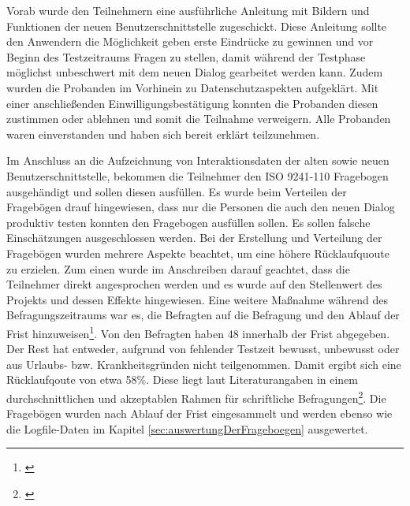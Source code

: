 Vorab wurde den Teilnehmern eine ausführliche Anleitung mit Bildern und Funktionen der neuen Benutzerschnittstelle zugeschickt. Diese Anleitung sollte den Anwendern die Möglichkeit geben erste Eindrücke zu gewinnen und vor Beginn des Testzeitraums Fragen zu stellen, damit während der Testphase möglichst unbeschwert mit dem neuen Dialog gearbeitet werden kann. Zudem wurden die Probanden im Vorhinein zu Datenschutzaspekten aufgeklärt. Mit einer anschließenden Einwilligungsbestätigung konnten die Probanden diesen zustimmen oder ablehnen und somit die Teilnahme verweigern. Alle Probanden waren einverstanden und haben sich bereit erklärt teilzunehmen.

Im Anschluss an die Aufzeichnung von Interaktionsdaten der alten sowie neuen Benutzerschnittstelle, bekommen die Teilnehmer den ISO 9241-110 Fragebogen ausgehändigt und sollen diesen ausfüllen. Es wurde beim Verteilen der Fragebögen drauf hingewiesen, dass nur die Personen die auch den neuen Dialog produktiv testen konnten den Fragebogen ausfüllen sollen. Es sollen falsche Einschätzungen ausgeschlossen werden. Bei der Erstellung und Verteilung der Fragebögen wurden mehrere Aspekte beachtet, um eine höhere Rücklaufquoute zu erzielen. Zum einen wurde im Anschreiben darauf geachtet, dass die Teilnehmer direkt angesprochen werden und es wurde auf den Stellenwert des Projekts und dessen Effekte hingewiesen. Eine weitere Maßnahme während des Befragungszeitraums war es, die Befragten auf die Befragung und den Ablauf der Frist hinzuweisen\footnote{\cite[vgl.][58]{Petermann2005}}. Von den Befragten haben 48 innerhalb der Frist abgegeben. Der Rest hat entweder, aufgrund von fehlender Testzeit bewusst, unbewusst oder aus Urlaubs- bzw. Krankheitsgründen nicht teilgenommen. Damit ergibt sich eine Rücklaufqoute von etwa 58\%. Diese liegt laut Literaturangaben in einem durchschnittlichen und akzeptablen Rahmen für schriftliche Befragungen\footnote{\cite[vgl.][58]{Petermann2005}}. Die Fragebögen wurden nach Ablauf der Frist eingesammelt und werden ebenso wie die Logfile-Daten im Kapitel \ref{sec:auswertungDerFrageboegen} ausgewertet.
